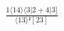 \documentclass[varwidth, border=5pt]{standalone}
\begin{document}
\begin{my}
$\begin{gathered}
\scriptscriptstyle\frac{1⟨14⟩⟨3|2+4|3]}{⟨13⟩²[23]}
\end{gathered}$
\end{my}
\end{document}
